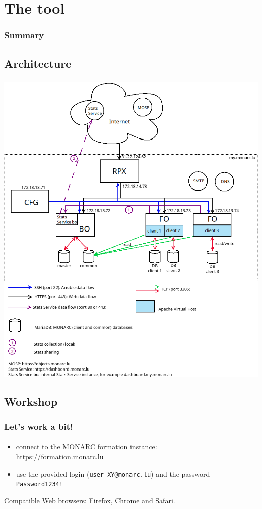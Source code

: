 %
%
\section{The tool}
\begin{frame}
  \frametitle{Summary}
\end{frame}
\subsection{Architecture}
\begin{frame}
  \frametitle{}
  \framesubtitle{}
  \begin{center}
    \includegraphics[scale=0.25]{pictures/monarc-architecture.png}
  \end{center}
\end{frame}



\subsection{Workshop}
\begin{frame}
  \frametitle{Let's work a bit!}
  \framesubtitle{}
  \begin{itemize}
    \item connect to the MONARC formation instance:\\
          \url{https://formation.monarc.lu}
    \item use the provided login (\texttt{user\_XY@monarc.lu}) and the password \texttt{Password1234!}
  \end{itemize}

  \bigskip
  Compatible Web browsers: Firefox, Chrome and Safari.
\end{frame}



